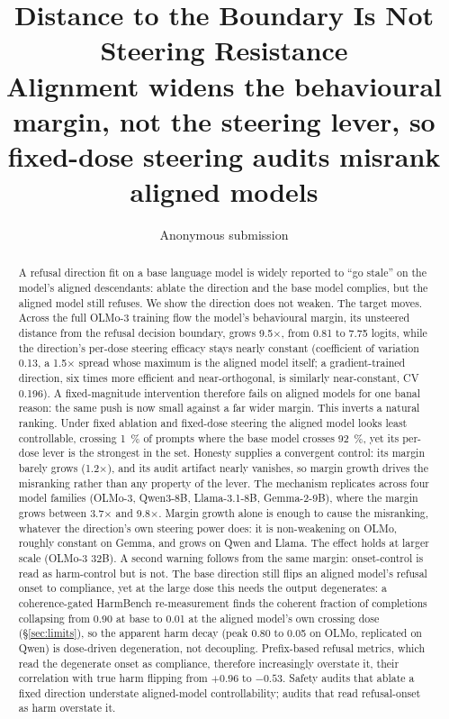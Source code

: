 \documentclass[11pt]{article}
\title{\bfseries Distance to the Boundary Is Not Steering Resistance\\[2pt]
\large Alignment widens the behavioural margin, not the steering lever, so
fixed-dose steering audits misrank aligned models}
\author{Anonymous submission}
\date{}
\newcommand{\x}{$\times$}
\begin{document}
\maketitle

\begin{abstract}
A refusal direction fit on a base language model is widely reported to ``go stale'' on the
model's aligned descendants: ablate the direction and the base model complies, but the aligned
model still refuses. We show the direction does not weaken. The target moves. Across the full
OLMo-3 training flow the model's behavioural margin, its unsteered distance from the refusal
decision boundary, grows \num{9.5}\x, from \num{0.81} to \num{7.75} logits, while the direction's
per-dose steering efficacy stays nearly constant (coefficient of variation \num{0.13}, a \num{1.5}\x{} spread whose maximum is the aligned model itself; a
gradient-trained direction, six times more efficient and near-orthogonal, is similarly near-constant, CV \num{0.196}). A fixed-magnitude intervention therefore fails on aligned models for one banal reason:
the same push is now small against a far wider margin. This inverts a natural ranking. Under fixed
ablation and fixed-dose steering the aligned model looks least controllable, crossing \SI{1}{\percent}
of prompts where the base model crosses \SI{92}{\percent}, yet its per-dose lever is the strongest
in the set. Honesty supplies a convergent control: its margin barely grows (\num{1.2}\x), and its audit
artifact nearly vanishes, so margin growth drives the misranking rather than any property of the
lever. The mechanism replicates across four model families (OLMo-3, Qwen3-8B, Llama-3.1-8B,
Gemma-2-9B), where the margin grows between \num{3.7}\x{} and \num{9.8}\x. Margin growth alone is
enough to cause the misranking, whatever the direction's own steering power does: it is non-weakening
on OLMo, roughly constant on Gemma, and grows on Qwen and Llama. The effect holds at larger scale
(OLMo-3 32B). A second warning follows from the same margin: onset-control is read as harm-control
but is not. The base direction still flips an aligned model's refusal onset to compliance, yet at the
large dose this needs the output degenerates: a coherence-gated HarmBench re-measurement finds the
coherent fraction of completions collapsing from \num{0.90} at base to \num{0.01} at the aligned
model's own crossing dose (\S\ref{sec:limits}), so the apparent harm decay (peak \num{0.80} to
\num{0.05} on OLMo, replicated on Qwen) is dose-driven degeneration, not decoupling. Prefix-based
refusal metrics, which read the degenerate onset as compliance, therefore increasingly overstate it,
their correlation with true harm flipping from $+0.96$ to $-0.53$. Safety audits that ablate a fixed direction understate aligned-model
controllability; audits that read refusal-onset as harm overstate it.
\end{abstract}
\end{document}
